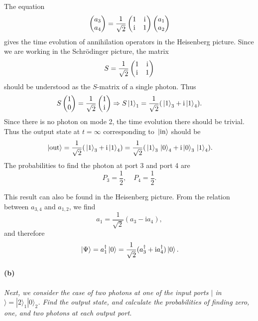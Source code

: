 \documentclass[hyperref, a4paper]{article}
\newcommand*{\ii}{\mathrm{i}}
\begin{document}
The equation 
\begin{equation}
    \pmqty{a_3 \\ a_4} = \frac{1}{\sqrt{2}} \pmqty{1 & \ii \\ \ii & 1} \pmqty{a_1 \\ a_2} 
\end{equation}
gives the time evolution of annihilation operators in the Heisenberg picture.
Since we are working in the Schrödinger picture, the matrix 
\begin{equation}
    S = \frac{1}{\sqrt{2}} \pmqty{1 & \ii \\ \ii & 1}
\end{equation}
should be understood as the $S$-matrix of a single photon.
Thus 
\[
    S \pmqty{1 \\ 0} = \frac{1}{\sqrt{2}} \pmqty{1 \\ \ii} \Rightarrow 
    S \ket*{1}_1 = \frac{1}{\sqrt{2}} (\ket*{1}_3 + \ii \ket*{1}_4) .
\]
Since there is no photon on mode 2, the time evolution there should be trivial.
Thus the output state at $t = \infty$ corresponding to $\ket*{\text{in}}$ should be 
\begin{equation}
    \ket*{\text{out}} = \frac{1}{\sqrt{2}} (\ket*{1}_3 + \ii \ket*{1}_4)
    = \frac{1}{\sqrt{2}} (\ket*{1}_3 \ket*{0}_4 + \ii \ket*{0}_3 \ket*{1}_4).
\end{equation}
The probabilities to find the photon at port 3 and port 4 are 
\begin{equation}
    P_3 = \frac{1}{2}, \quad P_4 = \frac{1}{2}.
\end{equation} 

This result can also be found in the Heisenberg picture.
From the relation between $a_{3,4}$ and $a_{1,2}$, we find 
\[
    a_1 = \frac{1}{\sqrt{2}} (a_3 - \ii a_4),
\]
and therefore 
\begin{equation}
    \ket*{\Psi} = a_1^\dag \ket*{0} = \frac{1}{\sqrt{2}} (a^\dag_3 + \ii a^\dag_4) \ket*{0}.
\end{equation}

\paragraph*{(b)} \textit{Next, we consider the case of two photons at one of the input ports $\mid$ in $\rangle=|2\rangle_1|0\rangle_2$. Find the output state, and calculate the probabilities of finding zero, one, and two photons at each output port.} 
\end{document}
